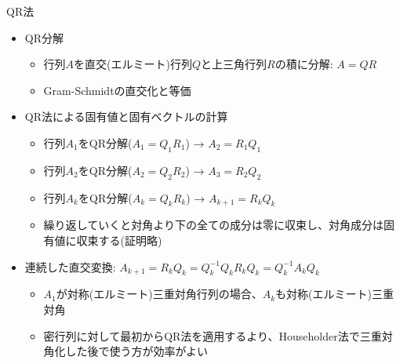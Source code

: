\begin{frame}[t,fragile]{QR法}
  \begin{itemize}
  \item QR分解
    \begin{itemize}
    \item 行列$A$を直交(エルミート)行列$Q$と上三角行列$R$の積に分解: $A=QR$
    \item Gram-Schmidtの直交化と等価
    \end{itemize}
  \item QR法による固有値と固有ベクトルの計算
    \begin{itemize}
    \item 行列$A_1$をQR分解($A_1=Q_1R_1$) → $A_2 = R_1Q_1$ 
    \item 行列$A_2$をQR分解($A_2=Q_2R_2$) → $A_3 = R_2Q_2$ 
    \item 行列$A_k$をQR分解($A_k=Q_kR_k$) → $A_{k+1} = R_kQ_k$
    \item 繰り返していくと対角より下の全ての成分は零に収束し、対角成分は固有値に収束する(証明略)
    \end{itemize}
  \item 連続した直交変換: $A_{k+1} = R_kQ_k = Q_k^{-1}Q_kR_kQ_k = Q_k^{-1}A_kQ_k$
    \begin{itemize}
    \item $A_1$が対称(エルミート)三重対角行列の場合、$A_k$も対称(エルミート)三重対角
    \item 密行列に対して最初からQR法を適用するより、Householder法で三重対角化した後で使う方が効率がよい
    \end{itemize}
  \end{itemize}
\end{frame}

